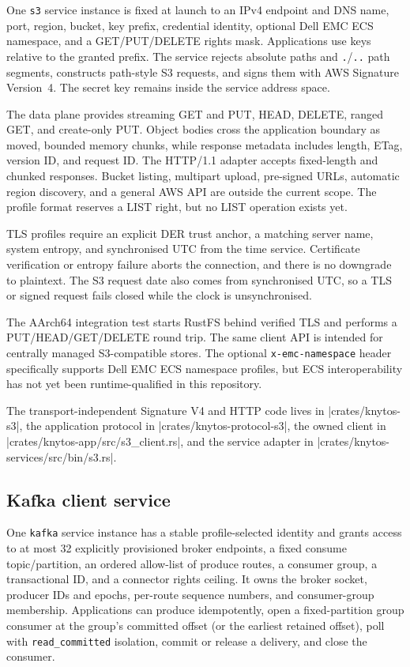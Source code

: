 One \texttt{s3} service instance is fixed at launch to an IPv4 endpoint and
DNS name, port, region, bucket, key prefix, credential identity, optional Dell
EMC ECS namespace, and a GET/PUT/DELETE rights mask. Applications use keys
relative to the granted prefix. The service rejects absolute paths and
\texttt{.}/\texttt{..} path segments, constructs path-style S3 requests, and
signs them with AWS Signature Version~4. The secret key remains inside the
service address space.

The data plane provides streaming GET and PUT, HEAD, DELETE, ranged GET, and
create-only PUT. Object bodies cross the application boundary as moved,
bounded memory chunks, while response metadata includes length, ETag, version ID,
and request ID. The HTTP/1.1 adapter accepts fixed-length and chunked
responses. Bucket listing, multipart upload, pre-signed URLs, automatic region
discovery, and a general AWS API are outside the current scope. The profile
format reserves a LIST right, but no LIST operation exists yet.

TLS profiles require an explicit DER trust anchor, a matching server name,
system entropy, and synchronised UTC from the time service. Certificate
verification or entropy failure aborts the connection, and there is no downgrade
to plaintext. The S3 request date also comes from synchronised UTC, so a TLS
or signed request fails closed while the clock is unsynchronised.

The AArch64 integration test starts RustFS behind verified TLS and performs a
PUT/HEAD/GET/DELETE round trip. The same client API is intended for
centrally managed S3-compatible stores. The optional
\texttt{x-emc-namespace} header specifically supports Dell EMC ECS namespace
profiles, but ECS interoperability has not yet been runtime-qualified in this
repository.

The transport-independent Signature V4 and HTTP code lives in
\repodir|crates/knytos-s3|, the application protocol in
\repodir|crates/knytos-protocol-s3|, the owned client in
\repofile|crates/knytos-app/src/s3_client.rs|, and the service adapter in
\repofile|crates/knytos-services/src/bin/s3.rs|.

\subsection{Kafka client service}
\label{sec:kafka-service}

One \texttt{kafka} service instance has a stable profile-selected identity and
grants access to at most 32 explicitly provisioned broker endpoints, a fixed
consume topic/partition, an ordered allow-list of produce routes, a consumer
group, a transactional ID, and a connector rights ceiling. It owns the broker socket,
producer IDs and epochs, per-route sequence numbers, and consumer-group
membership. Applications can produce idempotently, open a fixed-partition group
consumer at the group's committed offset (or the earliest retained offset),
poll with \texttt{read\_committed} isolation, commit or release a delivery, and
close the consumer.

